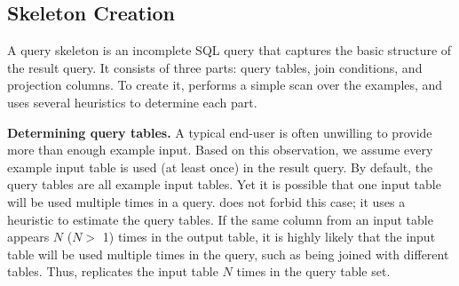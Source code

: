 \subsection{Skeleton Creation}
\label{sec:skeleton}

\vspace{-1mm}


A query skeleton is an incomplete SQL query
that captures the basic structure of the result query.
It consists of three parts: query tables,
join conditions, and projection columns.
To create it, \ourtool performs a simple scan over
the examples, and uses several heuristics to determine
each part.



\vspace{1mm}
{\textbf{Determining query tables.}} 
A typical end-user is often unwilling to provide more than enough
example input. Based on this observation, we assume every example input table
is used (at least once) in the result query.
By default, the query tables are all example input tables.
Yet it is possible that one input table will be
used multiple times in a query. \ourtool does not forbid this case;
it uses a heuristic to estimate the query tables.
If the same column from an input table appears $N$ ($N >$ 1) times in the
output table, it is highly likely that the input table
will be used multiple times in the query, such
as being joined with different tables.
Thus, \ourtool replicates the input table $N$ times in
the query table set.




